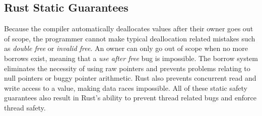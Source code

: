 \subsection{Rust Static Guarantees}
Because the compiler automatically deallocates values after their owner goes out of scope, the programmer cannot make typical deallocation related mistakes such as \textit{double free} or \textit{invalid free}.
An owner can only go out of scope when no more borrows exist, meaning that a \textit{use after free} bug is impossible.
The borrow system eliminates the necessity of using raw pointers and prevents problems relating to null pointers or buggy pointer arithmetic.
Rust also prevents concurrent read and write access to a value, making data races impossible.
All of these static safety guarantees also result in Rust's ability to prevent thread related bugs and enforce thread safety.


